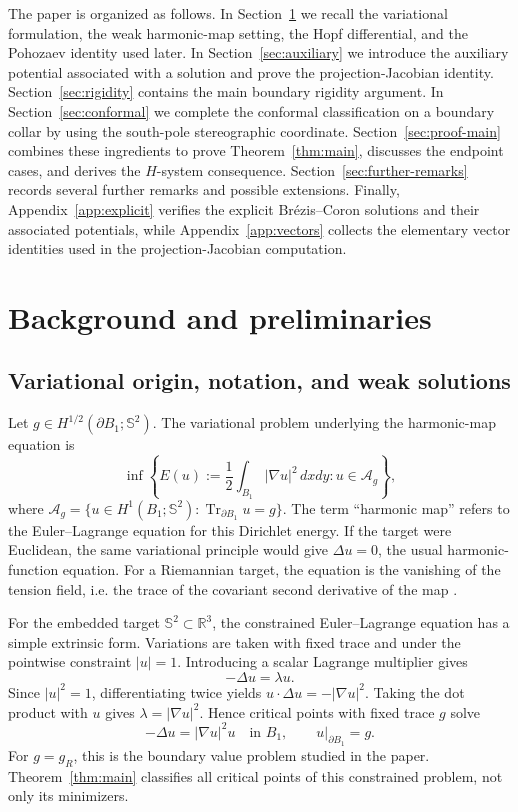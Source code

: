 \documentclass[11pt]{amsart}
\numberwithin{equation}{section}
\theoremstyle{remark}
\newcommand{\R}{\mathbb{R}}
\newcommand{\Sph}{\mathbb{S}^2}
\begin{document}
The paper is organized as follows. In Section~\ref{sec:prelim} we recall the variational formulation, the weak harmonic-map setting, the Hopf
differential, and the Pohozaev identity used later. In Section~\ref{sec:auxiliary} we introduce the auxiliary potential associated with a
solution and prove the projection-Jacobian identity. Section~\ref{sec:rigidity} contains the main boundary rigidity argument. In
Section~\ref{sec:conformal} we complete the conformal classification on a boundary collar by using the south-pole stereographic coordinate.
Section~\ref{sec:proof-main} combines these ingredients to prove Theorem~\ref{thm:main}, discusses the endpoint cases, and derives the
\(H\)-system consequence. Section~\ref{sec:further-remarks} records several further remarks and possible extensions. Finally,
Appendix~\ref{app:explicit} verifies the explicit Brézis--Coron solutions and their associated potentials, while Appendix~\ref{app:vectors}
collects the elementary vector identities used in the projection-Jacobian computation.



\section{Background and preliminaries}\label{sec:prelim}


\subsection{Variational origin, notation, and weak solutions}\label{subsec:variational-notation}

Let \(g\in H^{1/2}(\partial B_1;\Sph)\). The variational problem underlying the harmonic-map equation is
\begin{equation*}
\inf\left\{ E(u):=\frac12\int_{B_1}|\nabla u|^2\,dxdy: u\in\mathcal A_g\right\},
\end{equation*}
where $\mathcal A_g=\bigl\{u\in H^1(B_1;\Sph):\operatorname{Tr}_{\partial B_1}u=g\bigr\}$. The term ``harmonic map'' refers to the
Euler--Lagrange equation for this Dirichlet energy. If the target were Euclidean, the same variational principle would give \(\Delta u=0\),
the usual harmonic-function equation. For a Riemannian target, the equation is the vanishing of the tension field, i.e. the trace of the
covariant second derivative of the map \cite{EellsSampson1964,Helein}.

For the embedded target \(\Sph\subset\R^3\), the constrained Euler--Lagrange equation has a simple extrinsic form. Variations are taken with
fixed trace and under the pointwise constraint \(|u|=1\). Introducing a scalar Lagrange multiplier gives
\[
-\Delta u=\lambda u.
\]
Since \(|u|^2=1\), differentiating twice yields \(u\cdot\Delta u=-|\nabla u|^2\). Taking the dot product with \(u\) gives \(\lambda=|\nabla
u|^2\). Hence critical points with fixed trace \(g\) solve
\begin{equation}\label{eq:HM}
-\Delta u=|\nabla u|^2u
\quad\text{in }B_1,
\qquad
 u|_{\partial B_1}=g.
\end{equation}
For \(g=g_R\), this is the boundary value problem studied in the paper. Theorem~\ref{thm:main} classifies all critical points of this
constrained problem, not only its minimizers.
\end{document}
